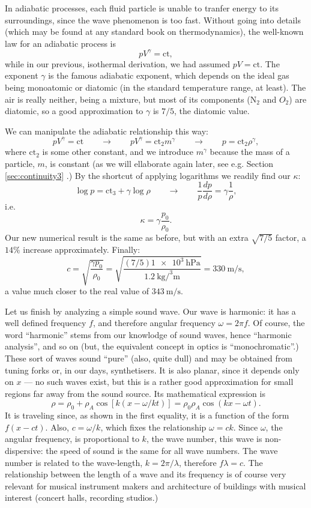 In adiabatic processes, each fluid particle is unable to tranfer
energy to its surroundings, since the wave phenomenon is too
fast. Without going into details (which may be found at any standard
book on thermodynamics), the well-known law for an adiabatic process is
\[
p V^\gamma = \mathrm{ct} ,
\]
while in our previous, isothermal derivation, we had assumed $ p V =
\mathrm{ct} $. The exponent $\gamma$ is the famous adiabatic exponent,
which depends on the ideal gas being monoatomic or diatomic (in the
standard temperature range, at least). The air is really neither,
being a mixture, but most of its components (N$_2$ and $O_2$) are
diatomic, so a good approximation to $\gamma$ is $7/5$, the diatomic
value.

We can manipulate the adiabatic relationship this way:
\[
p V^\gamma = \mathrm{ct} \qquad\to\qquad
p V^\gamma = \mathrm{ct}_2 m^\gamma \qquad\to\qquad
p = \mathrm{ct}_2 \rho^\gamma ,
\]
where $\mathrm{ct}_2$ is some other constant, and we introduce
$m^\gamma$ because the mass of a particle, $m$, is constant (as we
will ellaborate again later, see e.g. Section \ref{sec:continuity3} .)
By the shortcut of applying logarithms we readily find our $\kappa$:
\[
\log p = \mathrm{ct}_3 + \gamma \log \rho  \qquad\to\qquad
\frac{1}{ p }
\frac{d p}{d\rho}=  \gamma \frac{1}{\rho} ,
\]
i.e.
\[
\kappa = \gamma \frac{p_0}{\rho_0} .
\]
Our new numerical result is the same as before, but with
an extra $\sqrt{7/5}$ factor, a $14\%$ increase approximately.
Finally:
\[
c= \sqrt{\frac{\gamma p_0 }{ \rho_0 }} =
\sqrt{\frac%
  { (7/5)  \SI{1e3}{\hecto\pascal} }%
  {\SI{1.2}{\kilo\gram\per\cubed\meter}}} =
\SI{330}{\meter\per\second} ,
\]
a value much closer to the real value of $\SI{343}{\meter\per\second} $.

Let us finish by analyzing a simple sound wave. Our wave is harmonic:
it has a well defined frequency $f$, and therefore angular frequency
$\omega=2\pi f$. Of course, the word ``harmonic'' stems from our
knowlodge of sound waves, hence ``harmonic analysis'', and so on (but,
the equivalent concept in optics is ``monochromatic''.) These sort of
waves sound ``pure'' (also, quite dull) and may be obtained from
tuning forks or, in our days, synthetisers. It is also planar, since
it depends only on $x$ --- no such waves exist, but this is a rather
good approximation for small regions far away from the sound source.
Its mathematical expression is
\[
\rho = \rho_0 +  \rho_A \cos[ k ( x  - \omega/k  t) ]
= \rho_0 \rho_A \cos(k x  - \omega t) .
\]
It is traveling since, as shown in the first equality, it is a
function of the form $f(x-ct)$. Also, $c= \omega/k$, which fixes the
relationship $\omega = c k$. Since $\omega$, the angular frequency, is
proportional to $k$, the wave number, this wave is non-dispersive: the
speed of sound is the same for all wave numbers. The wave number is
related to the wave-length, $k=2\pi/\lambda$, therefore $f \lambda =
c$. The relationship between the length of a wave and its frequency is
of course very relevant for musical instrument makers and architecture
of buildings with musical interest (concert halls, recording studios.)

